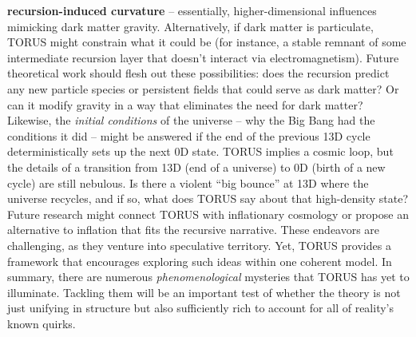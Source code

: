 \begin{itemize}
  \textbf{recursion-induced curvature} -- essentially,
  higher-dimensional influences mimicking dark matter gravity​.
  Alternatively, if dark matter is particulate, TORUS might constrain
  what it could be (for instance, a stable remnant of some intermediate
  recursion layer that doesn't interact via electromagnetism​). Future
  theoretical work should flesh out these possibilities: does the
  recursion predict any new particle species or persistent fields that
  could serve as dark matter? Or can it modify gravity in a way that
  eliminates the need for dark matter? Likewise, the \emph{initial
  conditions} of the universe -- why the Big Bang had the conditions it
  did -- might be answered if the end of the previous 13D cycle
  deterministically sets up the next 0D state. TORUS implies a cosmic
  loop, but the details of a transition from 13D (end of a universe) to
  0D (birth of a new cycle) are still nebulous. Is there a violent ``big
  bounce'' at 13D where the universe recycles, and if so, what does
  TORUS say about that high-density state? Future research might connect
  TORUS with inflationary cosmology or propose an alternative to
  inflation that fits the recursive narrative. These endeavors are
  challenging, as they venture into speculative territory. Yet, TORUS
  provides a framework that encourages exploring such ideas within one
  coherent model. In summary, there are numerous \emph{phenomenological}
  mysteries that TORUS has yet to illuminate. Tackling them will be an
  important test of whether the theory is not just unifying in structure
  but also sufficiently rich to account for all of reality's known
  quirks.
\end{itemize}

